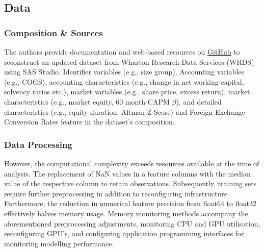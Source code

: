 \documentclass[12pt]{article}
\begin{document}
{\subsection{Data} \label{dss}
\subsubsection{Composition \& Sources}
The authors provide documentation and web-based resources on \href{https://github.com/bkelly-lab/ReplicationCrisis}{GitHub} to reconstruct an updated dataset from Wharton Research Data Services (WRDS) using SAS Studio.
Identifier variables (e.g., size group), Accounting variables (e.g., COGS), accounting characteristics (e.g., change in net working capital, solvency ratios etc.), market variables (e.g., share price, excess return), market characteristics (e.g., market equity, 60 month CAPM $\beta$), 
and detailed characteristics (e.g., equity duration, Altman Z-Score) and Foreign Exchange Conversion Rates feature in the dataset's composition.
\subsubsection{Data Processing} \label{data-processing}
However, the computational complexity exceeds resources available at the time of analysis.
The replacement of NaN values in a feature columns with the median value of the respective column to retain observations.
Subsequently, training sets require further preprocessing in addition to reconfiguring infrastructure.
Furthermore, the reduction in numerical feature precision from float64 to float32 effectively halves memory usage. 
Memory monitoring methods accompany the aforementioned preprocessing adjustments, monitoring CPU and GPU utilisation, reconfiguring GPU's, and configuring application programming interfaces for monitoring modelling performance.
}
\end{document}
